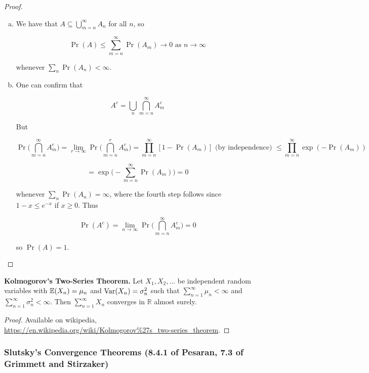 \begin{proof}
\begin{enumerate}[(a)]

\item We have that \(A \subseteq \bigcup_{m=n}^\infty A_n\) for all \(n\), so

\[
\Pr(A) \leq \sum_{m=n}^\infty \Pr(A_m) \to 0 \text{ as } n \to \infty
\]

whenever \(\sum_n \Pr(A_n) < \infty\).

\item One can confirm that 

\[
A^c = \bigcup_n \bigcap_{m=n}^\infty A_m^c
\]

But 

\[
\Pr \bigg( \bigcap_{m=n}^\infty A_m^c \bigg) = \lim_{r \to \infty}\Pr \bigg( \bigcap_{m=n}^r A_m^c \bigg) = \prod_{m=n}^\infty[ 1 - \Pr(A_m)] \text{ (by independence) } \leq  \prod_{m=n}^\infty \exp(- \Pr(A_m)) 
\]

\[
= \exp \bigg(- \sum_{m=n}^\infty \Pr(A_m) \bigg) = 0
\]

whenever \(\sum_n \Pr(A_n) = \infty\), where the fourth step follows since \(1 - x \leq e^{-x}\) if \(x \geq 0\). Thus

\[
\Pr(A^c) = \lim_{n \to \infty} \Pr \bigg( \bigcap_{m=n}^\infty A_m^c \bigg) = 0
\]

so \(\Pr(A) = 1\).

\end{enumerate}
\end{proof}

\begin{theorem}\label{asym:k2st}\textbf{Kolmogorov's Two-Series Theorem.} Let \(X_1, X_2, \ldots\) be independent random variables with \(\mathbb{E}(X_n) = \mu_n\) and \(\mathrm{Var}(X_n) = \sigma_n^2\) such that \(\sum_{n=1}^\infty \mu_n < \infty\) and \(\sum_{n=1}^\infty \sigma_n^2 < \infty\). Then \(\sum_{n=1}^\infty X_n\) converges in \(\mathbb{R}\) almost surely.
\end{theorem}

\begin{proof}Available on wikipedia, \url{https://en.wikipedia.org/wiki/Kolmogorov\%27s_two-series_theorem}.\end{proof}

\subsubsection{Slutsky's Convergence Theorems (8.4.1 of Pesaran, 7.3 of Grimmett and Stirzaker)}

